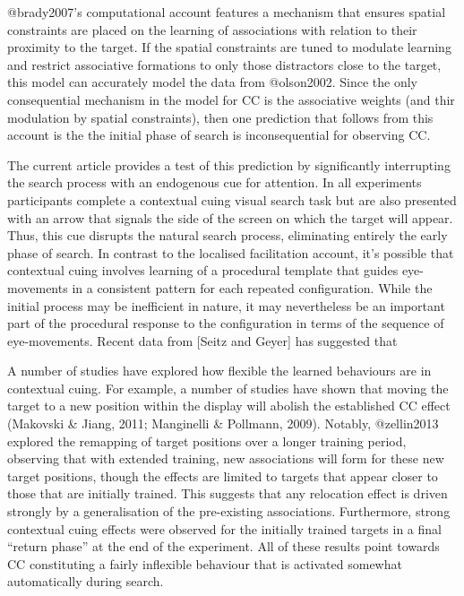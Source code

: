 \documentclass[
  man,
  floatsintext,
  longtable,
  nolmodern,
  notxfonts,
  notimes,
  colorlinks=true,linkcolor=blue,citecolor=blue,urlcolor=blue]{apa7}
\begin{document}
@brady2007's computational account features a mechanism that ensures
spatial constraints are placed on the learning of associations with
relation to their proximity to the target. If the spatial constraints
are tuned to modulate learning and restrict associative formations to
only those distractors close to the target, this model can accurately
model the data from @olson2002. Since the only consequential mechanism
in the model for CC is the associative weights (and thir modulation by
spatial constraints), then one prediction that follows from this account
is the the initial phase of search is inconsequential for observing CC.

The current article provides a test of this prediction by significantly
interrupting the search process with an endogenous cue for attention. In
all experiments participants complete a contextual cuing visual search
task but are also presented with an arrow that signals the side of the
screen on which the target will appear. Thus, this cue disrupts the
natural search process, eliminating entirely the early phase of search.
In contrast to the localised facilitation account, it's possible that
contextual cuing involves learning of a procedural template that guides
eye-movements in a consistent pattern for each repeated configuration.
While the initial process may be inefficient in nature, it may
nevertheless be an important part of the procedural response to the
configuration in terms of the sequence of eye-movements. Recent data
from {[}Seitz and Geyer{]} has suggested that

A number of studies have explored how flexible the learned behaviours
are in contextual cuing. For example, a number of studies have shown
that moving the target to a new position within the display will abolish
the established CC effect (Makovski \& Jiang, 2011; Manginelli \&
Pollmann, 2009). Notably, @zellin2013 explored the remapping of target
positions over a longer training period, observing that with extended
training, new associations will form for these new target positions,
though the effects are limited to targets that appear closer to those
that are initially trained. This suggests that any relocation effect is
driven strongly by a generalisation of the pre-existing associations.
Furthermore, strong contextual cuing effects were observed for the
initially trained targets in a final ``return phase'' at the end of the
experiment. All of these results point towards CC constituting a fairly
inflexible behaviour that is activated somewhat automatically during
search.
\end{document}
